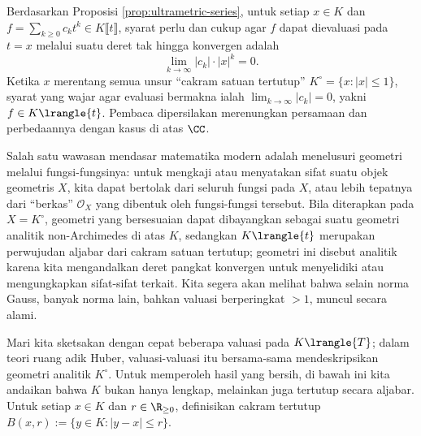 \begin{remark}
	Berdasarkan Proposisi \ref{prop:ultrametric-series}, untuk setiap $x \in K$ dan $f = \sum_{k \geq 0} c_k t^k \in K\llbracket t \rrbracket$, syarat perlu dan cukup agar $f$ dapat dievaluasi pada $t=x$ melalui suatu deret tak hingga konvergen adalah
	\[ \lim_{k \to \infty} |c_k| \cdot |x|^k = 0. \]
	Ketika $x$ merentang semua unsur ``cakram satuan tertutup'' $K^\circ = \{x : |x| \leq 1 \}$, syarat yang wajar agar evaluasi bermakna ialah $\lim_{k \to \infty} |c_k| = 0$, yakni $f \in K\lrangle{t}$. Pembaca dipersilakan merenungkan persamaan dan perbedaannya dengan kasus di atas $\CC$.
	
	Salah satu wawasan mendasar matematika modern adalah menelusuri geometri melalui fungsi-fungsinya: untuk mengkaji atau menyatakan sifat suatu objek geometris $X$, kita dapat bertolak dari seluruh fungsi pada $X$, atau lebih tepatnya dari ``berkas'' $\mathcal{O}_X$ yang dibentuk oleh fungsi-fungsi tersebut. Bila diterapkan pada $X = K^\circ$, geometri yang bersesuaian dapat dibayangkan sebagai suatu geometri analitik non-Archimedes di atas $K$, sedangkan $K\lrangle{t}$ merupakan perwujudan aljabar dari cakram satuan tertutup; geometri ini disebut analitik karena kita mengandalkan deret pangkat konvergen untuk menyelidiki atau mengungkapkan sifat-sifat terkait. Kita segera akan melihat bahwa selain norma Gauss, banyak norma lain, bahkan valuasi berperingkat $> 1$, muncul secara alami. 
\end{remark}

Mari kita sketsakan dengan cepat beberapa valuasi pada $K\lrangle{T}$; dalam teori ruang adik Huber, valuasi-valuasi itu bersama-sama mendeskripsikan geometri analitik $K^\circ$. Untuk memperoleh hasil yang bersih, di bawah ini kita andaikan bahwa $K$ bukan hanya lengkap, melainkan juga tertutup secara aljabar. Untuk setiap $x \in K$ dan $r \in \R_{\geq 0}$, definisikan cakram tertutup $B(x,r) := \{ y \in K: |y-x| \leq r \}$.

